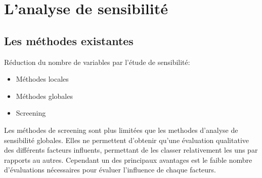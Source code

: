 





\section{L’analyse de sensibilité} %
\label{sec:l_analyse_de_sensibilite}

\subsection{Les méthodes existantes} %
\label{sub:les_méthodes_existantes}
Réduction du nombre de variables par l’étude de sensibilité:
\begin{itemize}
    \item Méthodes locales
    \item Méthodes globales
    \item Screening
\end{itemize}

Les méthodes de screening sont plus limitées que les methodes d’analyse de sensibilité
globales. Elles ne permettent d’obtenir qu’une évaluation qualitative des différents
facteurs influents, permettant de les classer relativement les uns par rapports au autres.
Cependant un des principaux avantages est le faible nombre d’évaluations nécessaires
pour évaluer l’influence de chaque facteurs.

